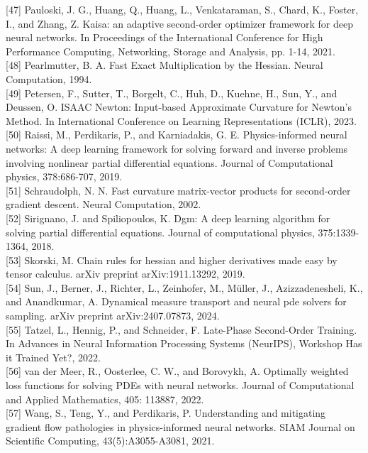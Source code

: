 \documentclass[10pt]{article}
\begin{document}
[47] Pauloski, J. G., Huang, Q., Huang, L., Venkataraman, S., Chard, K., Foster, I., and Zhang, Z. Kaisa: an adaptive second-order optimizer framework for deep neural networks. In Proceedings of the International Conference for High Performance Computing, Networking, Storage and Analysis, pp. 1-14, 2021.\\[0pt]
[48] Pearlmutter, B. A. Fast Exact Multiplication by the Hessian. Neural Computation, 1994.\\[0pt]
[49] Petersen, F., Sutter, T., Borgelt, C., Huh, D., Kuehne, H., Sun, Y., and Deussen, O. ISAAC Newton: Input-based Approximate Curvature for Newton's Method. In International Conference on Learning Representations (ICLR), 2023.\\[0pt]
[50] Raissi, M., Perdikaris, P., and Karniadakis, G. E. Physics-informed neural networks: A deep learning framework for solving forward and inverse problems involving nonlinear partial differential equations. Journal of Computational physics, 378:686-707, 2019.\\[0pt]
[51] Schraudolph, N. N. Fast curvature matrix-vector products for second-order gradient descent. Neural Computation, 2002.\\[0pt]
[52] Sirignano, J. and Spiliopoulos, K. Dgm: A deep learning algorithm for solving partial differential equations. Journal of computational physics, 375:1339-1364, 2018.\\[0pt]
[53] Skorski, M. Chain rules for hessian and higher derivatives made easy by tensor calculus. arXiv preprint arXiv:1911.13292, 2019.\\[0pt]
[54] Sun, J., Berner, J., Richter, L., Zeinhofer, M., Müller, J., Azizzadenesheli, K., and Anandkumar, A. Dynamical measure transport and neural pde solvers for sampling. arXiv preprint arXiv:2407.07873, 2024.\\[0pt]
[55] Tatzel, L., Hennig, P., and Schneider, F. Late-Phase Second-Order Training. In Advances in Neural Information Processing Systems (NeurIPS), Workshop Has it Trained Yet?, 2022.\\[0pt]
[56] van der Meer, R., Oosterlee, C. W., and Borovykh, A. Optimally weighted loss functions for solving PDEs with neural networks. Journal of Computational and Applied Mathematics, 405: 113887, 2022.\\[0pt]
[57] Wang, S., Teng, Y., and Perdikaris, P. Understanding and mitigating gradient flow pathologies in physics-informed neural networks. SIAM Journal on Scientific Computing, 43(5):A3055-A3081, 2021.\\[0pt]
\end{document}
